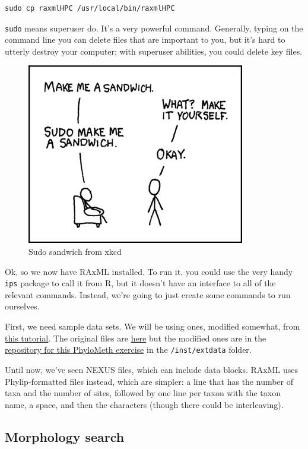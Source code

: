 \documentclass[]{article}
\begin{document}
\begin{verbatim}
sudo cp raxmlHPC /usr/local/bin/raxmlHPC
\end{verbatim}

\texttt{sudo} means superuser do. It's a very powerful command. Generally, typing on the command line you can delete files that are important to you, but it's hard to utterly destroy your computer; with superuser abilities, you could delete key files.

\begin{figure}
\centering
\includegraphics{images/sandwich.png}
\caption{Sudo sandwich from xkcd}
\end{figure}

Ok, so we now have RAxML installed. To run it, you could use the very handy \texttt{ips} package to call it from R, but it doesn't have an interface to all of the relevant commands. Instead, we're going to just create some commands to run ourselves.

First, we need sample data sets. We will be using ones, modified somewhat, from \href{http://sco.h-its.org/exelixis/web/software/raxml/hands_on.html}{this tutorial}. The original files are \href{http://sco.h-its.org/exelixis/resource/download/hands-on/Hands-On.tar.bz2}{here} but the modified ones are in the \href{https://github.com/PhyloMeth/LikelihoodTrees}{repository for this PhyloMeth exercise} in the \texttt{/inst/extdata} folder.

Until now, we've seen NEXUS files, which can include data blocks. RAxML uses Phylip-formatted files instead, which are simpler: a line that has the number of taxa and the number of sites, followed by one line per taxon with the taxon name, a space, and then the characters (though there could be interleaving).

\hypertarget{morphology-search}{%
\subsection{Morphology search}\label{morphology-search}}
\end{document}
